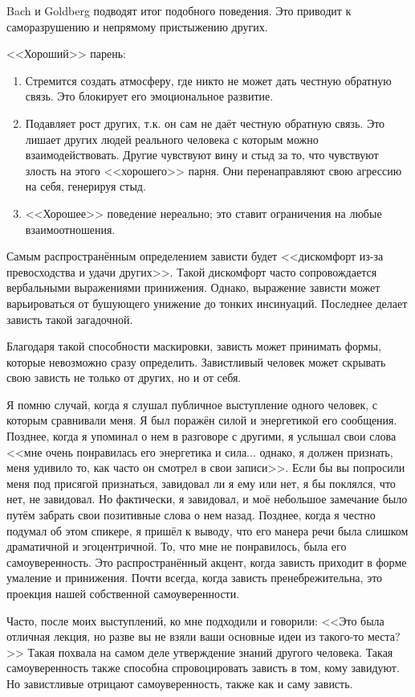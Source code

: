 \documentclass[10pt, fleqn]{article}
\begin{document}
Bach и Goldberg подводят итог подобного поведения. Это приводит к саморазрушению и непрямому пристыжению других.

<<Хороший>> парень:
\begin{enumerate}
\item Стремится создать атмосферу, где никто не может дать честную обратную связь. Это блокирует его эмоциональное развитие.
\item Подавляет рост других, т.к. он сам не даёт честную обратную связь. Это лишает других людей реального человека с которым можно взаимодействовать. Другие чувствуют вину и стыд за то, что чувствуют злость на этого <<хорошего>> парня. Они перенаправляют свою агрессию на себя, генерируя стыд.
\item <<Хорошее>> поведение нереально; это ставит ограничения на любые взаимоотношения.
\end{enumerate}



Самым распространённым определением зависти будет <<дискомфорт из-за превосходства и удачи других>>. Такой дискомфорт часто сопровождается вербальными выражениями принижения. Однако, выражение зависти может варьироваться от бушующего унижение до тонких инсинуаций. Последнее делает зависть такой загадочной.

Благодаря такой способности маскировки, зависть может принимать формы, которые невозможно сразу определить. Завистливый человек может скрывать свою зависть не только от других, но и от себя.

Я помню случай, когда я слушал публичное выступление одного человек, с которым сравнивали меня. Я был поражён силой и энергетикой его сообщения. Позднее, когда я упоминал о нем в разговоре с другими, я услышал свои слова <<мне очень понравилась его энергетика и сила... однако, я должен признать, меня удивило то, как часто он смотрел в свои записи>>. Если бы вы попросили меня под присягой признаться, завидовал ли я ему или нет, я бы поклялся, что нет, не завидовал.
Но фактически, я завидовал, и моё небольшое замечание было путём забрать свои позитивные слова о нем назад. Позднее, когда я честно подумал об этом спикере, я пришёл к выводу, что его манера речи была слишком драматичной и эгоцентричной. То, что мне не понравилось, была его самоуверенность. Это распространённый акцент, когда зависть приходит в форме умаление и принижения. Почти всегда, когда зависть пренебрежительна, это проекция нашей собственной самоуверенности.

Часто, после моих выступлений, ко мне подходили и говорили: <<Это была отличная лекция, но разве вы не взяли ваши основные идеи из такого-то места?>> Такая похвала на самом деле утверждение знаний другого человека. Такая самоуверенность также способна спровоцировать зависть в том, кому завидуют. Но завистливые отрицают самоуверенность, также как и саму зависть.
\end{document}
